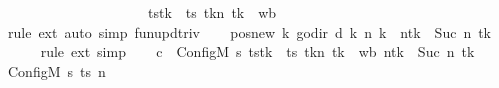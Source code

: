 \begin{isabellebody}
\ \ \ \ \ \ \ \ \ \ \ \ \ \ \ \ \ \ \ \ {\isacharequal}{\kern0pt}\ ts{\isacharparenleft}{\kern0pt}tk\ {\isacharcolon}{\kern0pt}{\isacharequal}{\kern0pt}\ {\isacharparenleft}{\kern0pt}ts\ tk{\isacharparenright}{\kern0pt}{\isacharparenleft}{\kern0pt}n\ tk\ {\isacharcolon}{\kern0pt}{\isacharequal}{\kern0pt}\ {\isacharquery}{\kern0pt}wb{\isacharparenright}{\kern0pt}{\isacharparenright}{\kern0pt}{\isachardoublequoteclose}\isanewline
\ \ \ \ \isamarkupfalse%
\ {\isacharparenleft}{\kern0pt}rule\ ext{\isacharparenright}{\kern0pt}\ {\isacharparenleft}{\kern0pt}auto\ simp{\isacharcolon}{\kern0pt}\ fun{\isacharunderscore}{\kern0pt}upd{\isacharunderscore}{\kern0pt}triv{\isacharparenright}{\kern0pt}\isanewline
\ \ \isamarkupfalse%
\ pos{\isacharunderscore}{\kern0pt}new{\isacharcolon}{\kern0pt}\ {\isachardoublequoteopen}{\isacharparenleft}{\kern0pt}{\isasymlambda}k{\isachardot}{\kern0pt}\ go{\isacharunderscore}{\kern0pt}dir\ {\isacharparenleft}{\kern0pt}{\isacharquery}{\kern0pt}d\ k{\isacharparenright}{\kern0pt}\ {\isacharparenleft}{\kern0pt}n\ k{\isacharparenright}{\kern0pt}{\isacharparenright}{\kern0pt}\ {\isacharequal}{\kern0pt}\ n{\isacharparenleft}{\kern0pt}tk\ {\isacharcolon}{\kern0pt}{\isacharequal}{\kern0pt}\ Suc\ {\isacharparenleft}{\kern0pt}n\ tk{\isacharparenright}{\kern0pt}{\isacharparenright}{\kern0pt}{\isachardoublequoteclose}\isanewline
\ \ \ \ \isamarkupfalse%
\ {\isacharparenleft}{\kern0pt}rule\ ext{\isacharparenright}{\kern0pt}\ simp\isanewline
\ \ \isamarkupfalse%
\ {\isacharquery}{\kern0pt}c{\isacharprime}{\kern0pt}{\isacharprime}{\kern0pt}\ {\isacharequal}{\kern0pt}\ {\isachardoublequoteopen}Config\isactrlsub M\ {\isacharquery}{\kern0pt}s{\isacharprime}{\kern0pt}\ {\isacharparenleft}{\kern0pt}ts{\isacharparenleft}{\kern0pt}tk\ {\isacharcolon}{\kern0pt}{\isacharequal}{\kern0pt}\ {\isacharparenleft}{\kern0pt}ts\ tk{\isacharparenright}{\kern0pt}{\isacharparenleft}{\kern0pt}n\ tk\ {\isacharcolon}{\kern0pt}{\isacharequal}{\kern0pt}\ {\isacharquery}{\kern0pt}wb{\isacharparenright}{\kern0pt}{\isacharparenright}{\kern0pt}{\isacharparenright}{\kern0pt}\ {\isacharparenleft}{\kern0pt}n{\isacharparenleft}{\kern0pt}tk\ {\isacharcolon}{\kern0pt}{\isacharequal}{\kern0pt}\ Suc\ {\isacharparenleft}{\kern0pt}n\ tk{\isacharparenright}{\kern0pt}{\isacharparenright}{\kern0pt}{\isacharparenright}{\kern0pt}{\isachardoublequoteclose}\isanewline
\ \ \isamarkupfalse%
\ {\isachardoublequoteopen}{\isacharparenleft}{\kern0pt}Config\isactrlsub M\ {\isacharquery}{\kern0pt}s\ ts\ n{\isacharcomma}{\kern0pt}\isanewline

\end{isabellebody}
